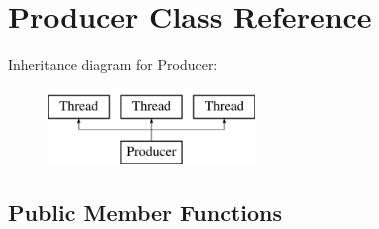 \hypertarget{class_producer}{
\section{\-Producer \-Class \-Reference}
\label{class_producer}
}
\-Inheritance diagram for \-Producer\-:\begin{figure}[H]
\begin{center}
\leavevmode
\includegraphics[height=2.000000cm]{class_producer}
\end{center}
\end{figure}
\subsection*{\-Public \-Member \-Functions}
